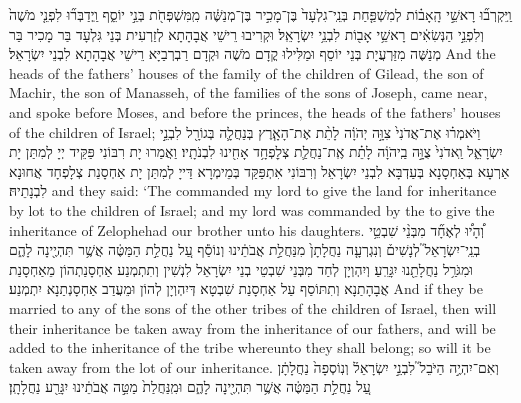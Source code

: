 {וַֽיִּקְרְב֞וּ רָאשֵׁ֣י הָֽאָב֗וֹת לְמִשְׁפַּ֤חַת בְּנֵֽי־גִלְעָד֙ בֶּן־מָכִ֣יר בֶּן־מְנַשֶּׁ֔ה מִֽמִּשְׁפְּחֹ֖ת בְּנֵ֣י יוֹסֵ֑ף וַֽיְדַבְּר֞וּ לִפְנֵ֤י מֹשֶׁה֙ וְלִפְנֵ֣י הַנְּשִׂאִ֔ים רָאשֵׁ֥י אָב֖וֹת לִבְנֵ֥י יִשְׂרָאֵֽל׃}
{וּקְרִיבוּ רֵישֵׁי אֲבָהָתָא לְזַרְעִית בְּנֵי גִּלְעָד בַּר מָכִיר בַּר מְנַשֶּׁה מִזַּרְעֲיָת בְּנֵי יוֹסֵף וּמַלִּילוּ קֳדָם מֹשֶׁה וּקְדָם רַבְרְבַיָּא רֵישֵׁי אֲבָהָתָא לִבְנֵי יִשְׂרָאֵל׃}
{And the heads of the fathers’ houses of the family of the children of Gilead, the son of Machir, the son of Manasseh, of the families of the sons of Joseph, came near, and spoke before Moses, and before the princes, the heads of the fathers’ houses of the children of Israel;}{}
{וַיֹּאמְר֗וּ אֶת־אֲדֹנִי֙ צִוָּ֣ה יְהֹוָ֔ה לָתֵ֨ת אֶת־הָאָ֧רֶץ בְּנַחֲלָ֛ה בְּגוֹרָ֖ל לִבְנֵ֣י יִשְׂרָאֵ֑ל וַֽאדֹנִי֙ צֻוָּ֣ה בַֽיהֹוָ֔ה לָתֵ֗ת אֶֽת־נַחֲלַ֛ת צְלׇפְחָ֥ד אָחִ֖ינוּ לִבְנֹתָֽיו׃}
{וַאֲמַרוּ יָת רִבּוֹנִי פַּקֵּיד יְיָ לְמִתַּן יָת אַרְעָא בְּאַחְסָנָא בְּעַדְבָּא לִבְנֵי יִשְׂרָאֵל וְרִבּוֹנִי אִתְפַּקַּד בְּמֵימְרָא דַּייָ לְמִתַּן יָת אַחְסָנַת צְלָפְחָד אֲחוּנָא לִבְנָתֵיהּ׃}
{and they said: ‘The \lord\space commanded my lord to give the land for inheritance by lot to the children of Israel; and my lord was commanded by the \lord\space to give the inheritance of Zelophehad our brother unto his daughters.}{}
{וְ֠הָי֠וּ לְאֶחָ֞ד מִבְּנֵ֨י שִׁבְטֵ֥י בְנֵֽי־יִשְׂרָאֵל֮ לְנָשִׁים֒ וְנִגְרְעָ֤ה נַחֲלָתָן֙ מִנַּחֲלַ֣ת אֲבֹתֵ֔ינוּ וְנוֹסַ֕ף עַ֚ל נַחֲלַ֣ת הַמַּטֶּ֔ה אֲשֶׁ֥ר תִּהְיֶ֖ינָה לָהֶ֑ם וּמִגֹּרַ֥ל נַחֲלָתֵ֖נוּ יִגָּרֵֽעַ׃
}
{וְיִהְוְיָן לְחַד מִבְּנֵי שִׁבְטֵי בְנֵי יִשְׂרָאֵל לִנְשִׁין וְתִתְמְנַע אַחְסָנַתְהוֹן מֵאַחְסָנַת אֲבָהָתַנָא וְתִתּוֹסַף עַל אַחְסָנַת שִׁבְטָא דְּיִהְוְיָן לְהוֹן וּמֵעֲדַב אַחְסָנְתַנָא יִתְמְנַע׃}
{And if they be married to any of the sons of the other tribes of the children of Israel, then will their inheritance be taken away from the inheritance of our fathers, and will be added to the inheritance of the tribe whereunto they shall belong; so will it be taken away from the lot of our inheritance.}{}
{וְאִם־יִהְיֶ֣ה הַיֹּבֵל֮ לִבְנֵ֣י יִשְׂרָאֵל֒ וְנֽוֹסְפָה֙ נַחֲלָתָ֔ן עַ֚ל נַחֲלַ֣ת הַמַּטֶּ֔ה אֲשֶׁ֥ר תִּהְיֶ֖ינָה לָהֶ֑ם וּמִֽנַּחֲלַת֙ מַטֵּ֣ה אֲבֹתֵ֔ינוּ יִגָּרַ֖ע נַחֲלָתָֽן׃
}
